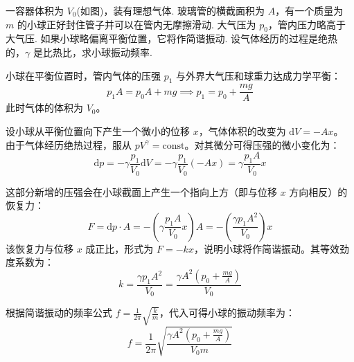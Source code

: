 \begin{exercise}\label{ex:11.5}
一容器体积为 $V_0$(如图)，装有理想气体. 玻璃管的横截面积为 $A$，有一个质量为 $m$ 的小球正好封住管子并可以在管内无摩擦滑动. 大气压为 $p_0$，管内压力略高于大气压. 如果小球略偏离平衡位置，它将作简谐振动. 设气体经历的过程是绝热的，$\gamma$ 是比热比，求小球振动频率.
\begin{center}
\end{center}
\end{exercise}
\begin{solution}
小球在平衡位置时，管内气体的压强 $p_1$ 与外界大气压和球重力达成力学平衡：
$$ p_1 A = p_0 A + mg \implies p_1 = p_0 + \frac{mg}{A} $$
此时气体的体积为 $V_0$。

设小球从平衡位置向下产生一个微小的位移 $x$，气体体积的改变为 $\mathrm{d}V = -Ax$。
由于气体经历绝热过程，服从 $p V^\gamma = \mathrm{const}$。对其微分可得压强的微小变化为：
$$ \mathrm{d}p = - \gamma \frac{p_1}{V_0} \mathrm{d}V = - \gamma \frac{p_1}{V_0} (-Ax) = \gamma \frac{p_1 A}{V_0} x $$

这部分新增的压强会在小球截面上产生一个指向上方（即与位移 $x$ 方向相反）的恢复力：
$$ F = \mathrm{d}p \cdot A = - \left( \gamma \frac{p_1 A}{V_0} x \right) A = - \left( \frac{\gamma p_1 A^2}{V_0} \right) x $$
该恢复力与位移 $x$ 成正比，形式为 $F = -kx$，说明小球将作简谐振动。其等效劲度系数为：
$$ k = \frac{\gamma p_1 A^2}{V_0} = \frac{\gamma A^2 \left(p_0 + \frac{mg}{A}\right)}{V_0} $$

根据简谐振动的频率公式 $f = \frac{1}{2\pi}\sqrt{\frac{k}{m}}$，代入可得小球的振动频率为：
$$ f = \frac{1}{2\pi} \sqrt{\frac{\gamma A^2 \left(p_0 + \frac{mg}{A}\right)}{V_0 m}} $$
\end{solution}

